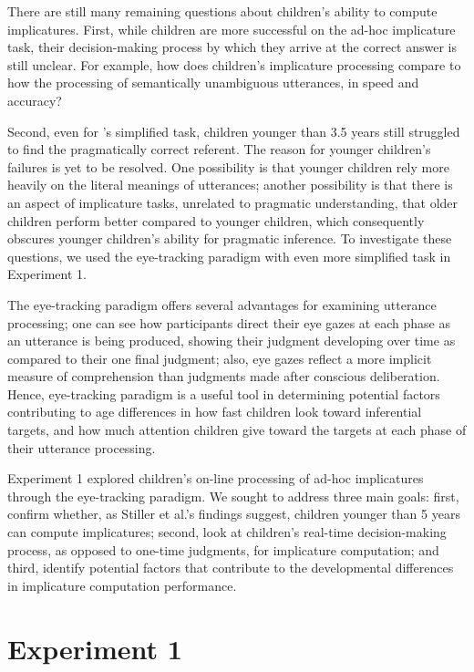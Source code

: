 \documentclass[10pt,letterpaper]{article}
\begin{document}
There are still many remaining questions about children's ability to compute implicatures. First, while children are more successful on the ad-hoc implicature task, their decision-making process by which they arrive at the correct answer is still unclear. For example, how does children's implicature processing compare to how the processing of semantically unambiguous utterances, in speed and accuracy? 

Second, even for  's simplified task, children younger than 3.5 years still struggled to find the pragmatically correct referent. The reason for younger children's failures is yet to be resolved. One possibility is that younger children rely more heavily on the literal meanings of utterances; another possibility is that there is an aspect of implicature tasks, unrelated to pragmatic understanding, that older children perform better compared to younger children, which consequently obscures younger children's ability for pragmatic inference. To investigate these questions, we used the eye-tracking paradigm with even more simplified task in Experiment 1.

The eye-tracking paradigm offers several advantages for examining utterance processing; one can see how participants direct their eye gazes at each phase as an utterance is being produced, showing their judgment developing over time as compared to their one final judgment; also, eye gazes reflect a more implicit measure of comprehension than judgments made after conscious deliberation. Hence, eye-tracking paradigm is a useful tool in determining potential factors contributing to age differences in how fast children look toward inferential targets, and how much attention children give toward the targets at each phase of their utterance processing.

Experiment 1 explored children's on-line processing of ad-hoc implicatures through the eye-tracking paradigm. We sought to address three main goals: first, confirm whether, as Stiller et al.'s findings suggest, children younger than 5 years can compute implicatures; second, look at children's real-time decision-making process, as opposed to one-time judgments, for implicature computation; and third, identify potential factors that contribute to the developmental differences in implicature computation performance.

\section{Experiment 1}
\end{document}
